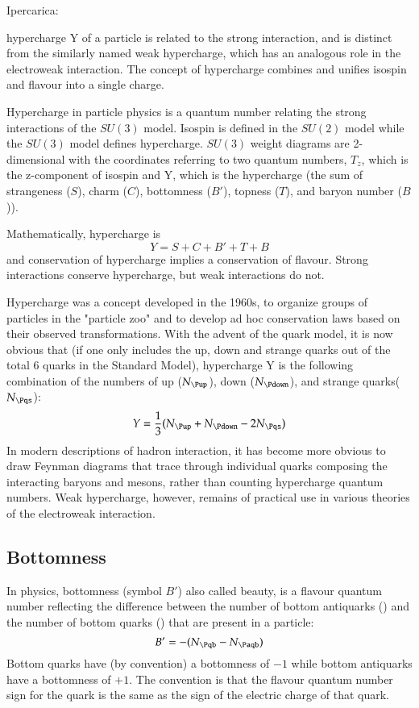 \documentclass[main.tex]{subfiles}
\begin{document}
Ipercarica:

hypercharge Y of a particle is related to the strong interaction, and is distinct from the similarly named weak hypercharge, which has an analogous role in the electroweak interaction. The concept of hypercharge combines and unifies isospin and flavour into a single charge. 

Hypercharge in particle physics is a quantum number relating the strong interactions of the $SU(3)$ model. Isospin is defined in the $SU(2)$ model while the $SU(3)$ model defines hypercharge. $SU(3)$ weight diagrams are 2-dimensional with the coordinates referring to two quantum numbers, $T_z$, which is the z-component of isospin and Y, which is the hypercharge (the sum of strangeness ($S$), charm ($C$), bottomness ($B'$), topness ($T$), and baryon number ($B$)).

Mathematically, hypercharge is
\begin{equation*}
Y=S+C+B'+T+B
\end{equation*}
and conservation of hypercharge implies a conservation of flavour. Strong interactions conserve hypercharge, but weak interactions do not.

Hypercharge was a concept developed in the 1960s, to organize groups of particles in the "particle zoo" and to develop ad hoc conservation laws based on their observed transformations. With the advent of the quark model, it is now obvious that (if one only includes the up, down and strange quarks out of the total 6 quarks in the Standard Model), hypercharge Y is the following combination of the numbers of up ($N_{\Pup}$), down ($N_{\Pdown}$), and strange quarks($N_{\Pqs}$):
\begin{equation*}
Y=\frac{1}{3}(N_{\Pup}+N_{\Pdown}-2N_{\Pqs})
\end{equation*}
In modern descriptions of hadron interaction, it has become more obvious to draw Feynman diagrams that trace through individual quarks composing the interacting baryons and mesons, rather than counting hypercharge quantum numbers. Weak hypercharge, however, remains of practical use in various theories of the electroweak interaction.

\subsection{Bottomness}

In physics, bottomness (symbol $B'$) also called beauty, is a flavour quantum number reflecting the difference between the number of bottom antiquarks (\Paqb) and the number of bottom quarks (\Pqb) that are present in a particle:
\begin{equation*}
B'=-(N_{\Pqb}-N_{\Paqb})
\end{equation*}
Bottom quarks have (by convention) a bottomness of $-1$ while bottom antiquarks have a bottomness of $+1$. The convention is that the flavour quantum number sign for the quark is the same as the sign of the electric charge of that quark.
\end{document}

